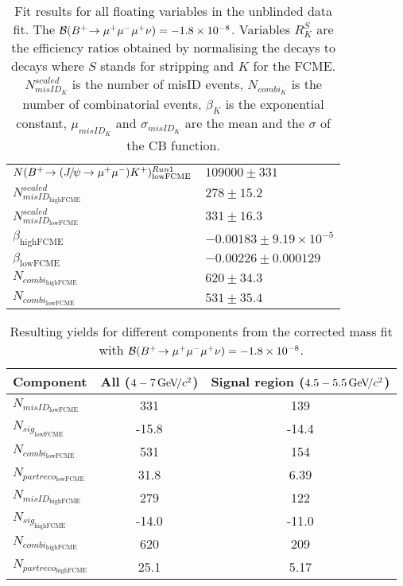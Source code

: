 \begin{table}[H]
\begin{tabular}{ l  l  }
$ N({{{B}^+}}\!\rightarrow ({{J\mskip -3mu/\mskip -2mu\psi\mskip 2mu}}\!\rightarrow {\ensuremath{\mu^+\mu^-}}){{K}^+})^{Run 1}_{\mathrm{lowFCME}} $ & $109000 \pm 331$ \\
$ N^{scaled}_{misID_{\mathrm{highFCME}}} $ & $278 \pm 15.2$ \\
$ N^{scaled}_{misID_{\mathrm{lowFCME}}} $ & $331 \pm 16.3$ \\
$ \beta_{\mathrm{highFCME}} $ & $-0.00183 \pm 9.19\times 10^{-5}$ \\
$ \beta_{\mathrm{lowFCME}} $ & $-0.00226 \pm 0.000129$ \\
$ N_{combi_{\mathrm{highFCME}}} $ & $620 \pm 34.3$ \\
$ N_{combi_{\mathrm{lowFCME}}} $ & $531 \pm 35.4$ \\
\bottomrule
\end{tabular}
\caption{Fit results for all floating variables in the unblinded data fit. The $\mathcal{B}({{{B}^+}}\!\rightarrow {\ensuremath{\mu^+\mu^-\mu^+}}\nu) =-1.8\times 10^{-8}$. Variables $R^{S}_{K}$ are the efficiency ratios obtained by normalising the decays to \bjpsimumuk decays where $S$ stands for stripping and $K$ for the FCME. $N^{scaled}_{misID_{K}}$ is the number of misID events, $N_{combi_{K}}$ is the number of combinatorial events, $\beta_{K}$ is the exponential constant, $\mu_{misID_{K}}$ and $\sigma_{misID_{K}}$ are the mean and the $\sigma$ of the CB function.}
\label{tab:floatingparsummary_fit}
\end{table}

\begin{table}[H]
\begin{center}
\begin{tabular}{ l  c  c }
\toprule
Component &  All ($4-7 {\mathrm{\,Ge\kern -0.1em V\!/}c^2}$) & Signal region ($4.5-5.5{\mathrm{\,Ge\kern -0.1em V\!/}c^2}$)  \\
\hline
$N_{misID_{\mathrm{lowFCME}}}$  &  331 & 139 \\
$N_{sig_{\mathrm{lowFCME}}}$  & -15.8  & -14.4 \\
$N_{combi_{\mathrm{lowFCME}}}$  & 531 & 154 \\
$N_{partreco_{\mathrm{lowFCME}}}$  & 31.8 & 6.39 \\
\hline
$N_{misID_{\mathrm{highFCME}}}$  &  279 & 122 \\
$N_{sig_{\mathrm{highFCME}}}$  &-14.0 & -11.0  \\
$N_{combi_{\mathrm{highFCME}}}$  & 620 & 209 \\
$N_{partreco_{\mathrm{highFCME}}}$ & 25.1 & 5.17 \\
\bottomrule
\end{tabular}
\end{center}
	\caption{Resulting yields for different components from the corrected mass fit with $\mathcal{B}({{{B}^+}}\!\rightarrow {\ensuremath{\mu^+\mu^-\mu^+}}\nu) =-1.8\times 10^{-8}$.}
\label{tab:yieldiatkos}
\end{table}


